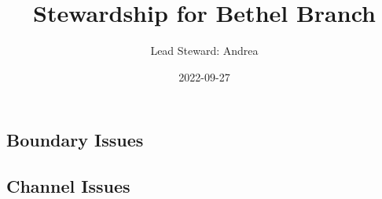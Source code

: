 \documentclass[
  landscape]{article}
\title{Stewardship for Bethel Branch}
\author{Lead Steward: Andrea}
\date{2022-09-27}
\begin{document}
\maketitle

\hypertarget{boundary-issues}{%
\subsection{Boundary Issues}\label{boundary-issues}}

\textbar\textbar{} \textbar\textbar{} \textbar\textbar{}
\textbar\textbar{}

\hypertarget{channel-issues}{%
\subsection{Channel Issues}\label{channel-issues}}
\end{document}

